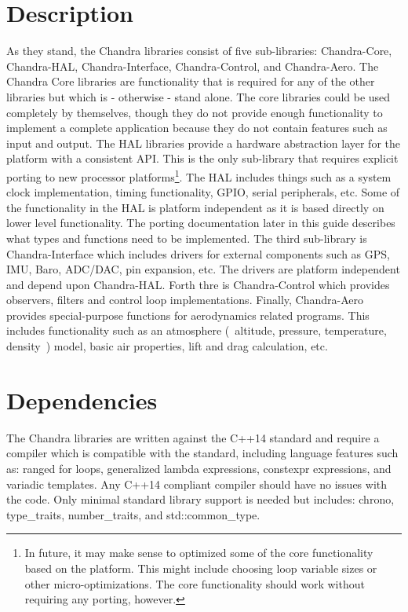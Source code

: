 \documentclass[10pt,letterpaper]{memoir} %
\begin{document}
\section{Description}
As they stand, the Chandra libraries consist of five sub-libraries: Chandra-Core, Chandra-HAL, Chandra-Interface, Chandra-Control, and Chandra-Aero.  The Chandra Core libraries are functionality that is required for any of the other libraries but which is - otherwise - stand alone.  The core libraries could be used completely by themselves, though they do not provide enough functionality to implement a complete application because they do not contain features such as input and output.  The HAL libraries provide a hardware abstraction layer for the platform with a consistent API.  This is the only sub-library that requires explicit porting to new processor platforms\footnote{In future, it may make sense to optimized some of the core functionality based on the platform.  This might include choosing loop variable sizes or other micro-optimizations.  The core functionality should work without requiring any porting, however.}.  The HAL includes things such as a system clock implementation, timing functionality, GPIO, serial peripherals, etc.  Some of the functionality in the HAL is platform independent as it is based directly on lower level functionality.  The porting documentation later in this guide describes what types and functions need to be implemented.  The third sub-library is Chandra-Interface which includes drivers for external components such as GPS, IMU, Baro, ADC/DAC, pin expansion, etc.  The drivers are platform independent and depend upon Chandra-HAL.  Forth thre is Chandra-Control which provides observers, filters and control loop implementations.  Finally, Chandra-Aero provides special-purpose functions for aerodynamics related programs.  This includes functionality such as an atmosphere (~altitude, pressure, temperature, density~) model, basic air properties, lift and drag calculation, etc.

\section{Dependencies}
The Chandra libraries are written against the C++14 standard and require a compiler which is compatible with the standard, including language features such as: ranged for loops, generalized lambda expressions, constexpr expressions, and variadic templates.  Any C++14 compliant compiler should have no issues with the code.  Only minimal standard library support is needed but includes: chrono, type\_traits, number\_traits, and std::common\_type.  
\end{document}
